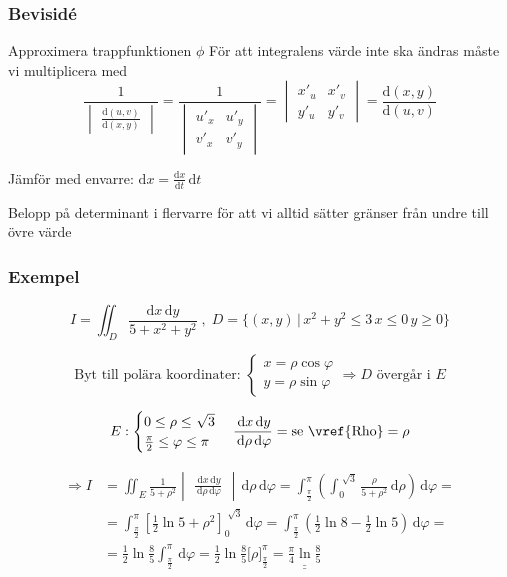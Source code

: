 \documentclass[a4paper]{article}
\newcommand{\svar}[1]{\underline{\underline{#1}}}
\let\oldsqrt\sqrt
\renewcommand*{\sqrt}[2][\ ]{\oldsqrt[#1]{#2} }
\begin{document}
\subsubsection{Bevisidé}
Approximera trappfunktionen $\phi$ \newline
För att integralens värde inte ska ändras måste vi multiplicera med 
$$
	\frac{1}{
	\begin{vmatrix}
		\frac{\mathrm{d}(u,v)}{\mathrm{d}(x,y)}
	\end{vmatrix}}
	= \frac{1}{
	\begin{vmatrix}
		u'_x & u'_y \\
		v'_x & v'_y
	\end{vmatrix}}
	= 
	\begin{vmatrix}
		x'_u & x'_v \\
		y'_u & y'_v
	\end{vmatrix} 
	= \frac{\mathrm{d}(x,y)}{\mathrm{d}(u,v)}
$$

Jämför med envarre: $\mathrm{d}x = \frac{\mathrm{d}x}{\mathrm{d}t}\,\mathrm{d}t$ \newline

Belopp på determinant i flervarre för att vi alltid sätter gränser från undre till övre värde

\subsubsection{Exempel}

$$I = \iint_D \frac{\mathrm{d}x\,\mathrm{d}y}{5+x^2+y^2} \; , \; D=\Big\{(x,y) \, | \, x^2+y^2 \leq 3 \, x \leq 0 \, y \geq 0\Big\}$$

$$\text{Byt till polära koordinater: } \left\{
\begin{array}{rcl}
	x = \rho\cos{\varphi} \\
	y = \rho\sin{\varphi}
\end{array}\right.
\Rightarrow D\text{ övergår i } E$$

$$E: 
\begin{cases}
	0 \leq \rho \leq \sqrt{3} \\
	\frac{\pi}{2} \leq \varphi \leq \pi
\end{cases} 
\frac{\,\mathrm{d}x\,\mathrm{d}y}{\,\mathrm{d}\rho\,\mathrm{d}\varphi} = \text{se \vref{Rho}} = \rho $$

\begin{align*}
\Rightarrow I &= \iint_E \frac{1}{5+\rho^2}
\begin{vmatrix}
	\frac{\,\mathrm{d}x\,\mathrm{d}y}{\,\mathrm{d}\rho\,\mathrm{d}\varphi}
\end{vmatrix}
\,\mathrm{d}\rho\,\mathrm{d}\varphi = \int_\frac{\pi}{2}^\pi \left( \int_0^{\sqrt{3}} \frac{\rho}{5+\rho^2} \,\mathrm{d}\rho \right)\,\mathrm{d}\varphi = \\
&= \int_\frac{\pi}{2}^\pi \left[ \frac{1}{2} \ln{5+\rho^2} \right]_0^{\sqrt{3}} \,\mathrm{d}\varphi = \int_\frac{\pi}{2}^\pi \left( \frac{1}{2} \ln{8} - \frac{1}{2} \ln{5} \right) \,\mathrm{d}\varphi = \\
&= \frac{1}{2} \ln{\frac{8}{5}} \int_\frac{\pi}{2}^\pi \,\mathrm{d}\varphi = \frac{1}{2}\ln{\frac{8}{5}} \Big[\rho\Big]_\frac{\pi}{2}^\pi = \svar{\frac{\pi}{4}\ln{\frac{8}{5}}}
\end{align*}
\end{document}
